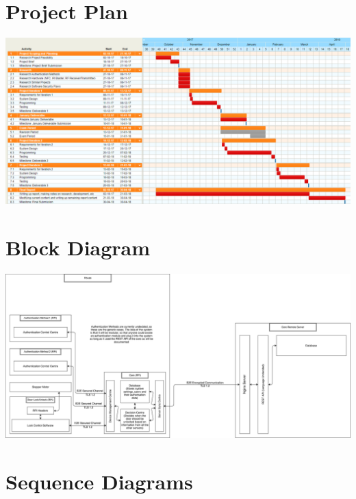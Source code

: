 \newpage
\section{Project Plan}
\begin{center}
	\includegraphics[angle=90,width=\textwidth,height=\textheight,keepaspectratio]{Graphics/FYP-Project-Plan}
\end{center}

\newpage
\section{Block Diagram}
\begin{center}
	\includegraphics[angle=90,width=\textwidth,height=\textheight,keepaspectratio]{Graphics/FYP-Block-Diagram}
\end{center}

\newpage
\section{Sequence Diagrams}
